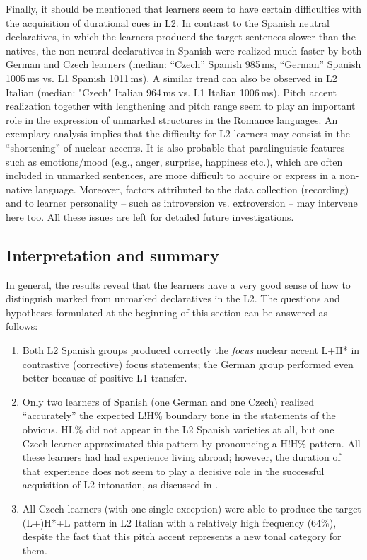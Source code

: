 Finally, it should be mentioned that learners seem to have certain difficulties with the acquisition of durational cues in L2. In contrast to the Spanish neutral declaratives, in which the learners produced the target sentences slower than the natives, the non-neutral declaratives in Spanish were realized much faster by both German and Czech learners (median: “Czech” Spanish 985\,ms, “German” Spanish 1005\,ms vs. L1 Spanish 1011\,ms). A similar trend can also be observed in L2 Italian (median: "Czech" Italian 964\,ms vs. L1 Italian 1006\,ms). Pitch accent realization together with lengthening and pitch range seem to play an important role in the expression of unmarked structures in the Romance languages. An exemplary analysis implies that the difficulty for L2 learners may consist in the “shortening” of nuclear accents. It is also probable that paralinguistic features such as emotions/mood (e.g., anger, surprise, happiness etc.), which are often included in unmarked sentences, are more difficult to acquire or express in a  non-native language. Moreover, factors attributed to the data collection (recording) and to learner personality -- such as introversion vs. extroversion -- may intervene here too. All these issues are left for detailed future investigations.

\subsection{Interpretation and summary}\label{sec:4.2.5}

In general, the results reveal that the learners have a very good sense of how to distinguish marked from unmarked declaratives in the L2. The questions and hypotheses formulated at the beginning of this section can be answered as follows:

\begin{enumerate}[label=H\arabic*,font=\PeskovaColonAfterItem]
\item
 Both  L2 Spanish groups produced correctly the \textit{focus}{} nuclear accent L+H* in contrastive (corrective) focus statements; the German group performed even better because of positive L1 transfer.

\item
 Only two learners of Spanish (one German and one Czech) realized “accurately” the expected L!H\% boundary tone in the statements of the obvious. HL\% did not appear in the L2 Spanish varieties at all, but one Czech learner approximated this pattern by pronouncing a H!H\% pattern. All these learners had had experience living abroad; however, the duration of that experience does not seem to play a decisive role in the successful acquisition of L2 intonation, as discussed in \citet{Pešková2022b}.

\item
 All Czech learners (with one single exception) were able to produce the target (L+)H*+L pattern in L2 Italian with a relatively high frequency (64\%), despite the fact that this pitch accent represents a new tonal category for them.

\end{enumerate}


